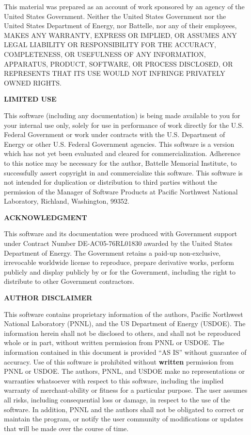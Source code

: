 %
%

This material was prepared as an account of work sponsored by an agency of the
United States Government.  Neither the United States Government nor the United
States Department of Energy, nor Battelle, nor any of their employees, MAKES
ANY WARRANTY, EXPRESS OR IMPLIED, OR ASSUMES ANY LEGAL LIABILITY OR
RESPONSIBILITY FOR THE ACCURACY, COMPLETENESS, OR USEFULNESS OF ANY
INFORMATION, APPARATUS, PRODUCT, SOFTWARE, OR PROCESS DISCLOSED, OR REPRESENTS
THAT ITS USE WOULD NOT INFRINGE PRIVATELY OWNED RIGHTS.


\begin{center}
{\bf LIMITED USE}
\end{center}

This software (including any documentation) is being made available to
you for your internal use only, solely for use in performance of work
directly for the U.S. Federal Government or work under contracts with
the U.S. Department of Energy or other U.S. Federal Government
agencies.  This software is a version which has not yet been evaluated
and cleared for commercialization.  Adherence to this notice may be
necessary for the author, Battelle Memorial Institute, to successfully
assert copyright in and commercialize this software.  This software is
not intended for duplication or distribution to third parties without
the permission of the Manager of Software Products at Pacific
Northwest National Laboratory, Richland, Washington, 99352.

\begin{center}
{\bf ACKNOWLEDGMENT}
\end{center}

This software and its documentation were produced with Government support under
Contract Number DE-AC05-76RL01830 awarded by the United States Department of
Energy.  The Government retains a paid-up non-exclusive, irrevocable worldwide
license to reproduce, prepare derivative works, perform publicly and display
publicly by or for the Government, including the right to distribute to other
Government contractors.


\clearpage

\begin{center}
{\bf AUTHOR DISCLAIMER}
\end{center}

This software contains proprietary information of the authors, Pacific
Northwest National Laboratory (PNNL), and the US Department of Energy (USDOE).
The information herein shall not be disclosed to others, and shall not
be reproduced whole or in part, without written permission from PNNL or
USDOE.  The information contained in this document is provided ``AS
IS'' without guarantee of accuracy.  Use of this software is
prohibited without {\bf written} permission from PNNL or USDOE.  The
authors, PNNL, and USDOE make no representations or warranties
whatsoever with respect to this software, including the implied
warranty of merchant-ability or fitness for a particular purpose.  The
user assumes all risks, including consequential loss or damage, in
respect to the use of the software.  In addition, PNNL and the authors
shall not be obligated to correct or maintain the program, or notify
the user community of modifications or updates that will be made over
the course of time.
